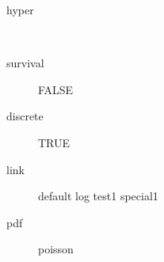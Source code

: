 \begin{description}
	\item[hyper]\ 
	 \item[ survival ] FALSE 
	 \item[ discrete ] TRUE 
	 \item[ link ] default log test1 special1 
	 \item[ pdf ] poisson 
\end{description}
